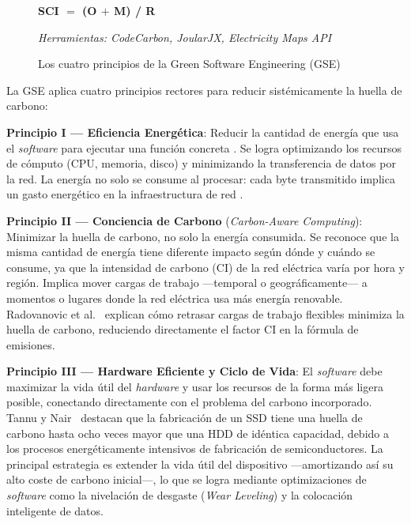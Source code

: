 \begin{figure}[htbp]
\begin{tcbraster}
\begin{tcolorbox}[
  title={Principio IV -- Medici\'on y transparencia},
  colbacktitle=gray!55,
  colframe=gray!50,
  colback=gray!4
]
  \vspace{6pt}\par
  \centering
  \large\textbf{SCI $=$ (O $+$ M) / R}
  \par\vspace{4pt}\raggedright
  \footnotesize\textit{Herramientas: CodeCarbon, JoularJX, Electricity Maps API}
\end{tcolorbox}
\end{tcbraster}
\caption{Los cuatro principios de la Green Software Engineering (GSE)}
\label{fig:gse-principios}
\end{figure}

La GSE aplica cuatro principios rectores para reducir sistémicamente la huella de carbono:



\textbf{Principio I — Eficiencia Energética}: Reducir la cantidad de energía que usa el \textit{software} para ejecutar una función concreta \cite{junger2024potentials}. Se logra optimizando los recursos de cómputo (CPU, memoria, disco) y minimizando la transferencia de datos por la red. La energía no solo se consume al procesar: cada byte transmitido implica un gasto energético en la infraestructura de red \cite{verdecchia2021green}.


\textbf{Principio II — Conciencia de Carbono} (\textit{Carbon-Aware Computing}): Minimizar la huella de carbono, no solo la energía consumida. Se reconoce que la misma cantidad de energía tiene diferente impacto según dónde y cuándo se consume, ya que la intensidad de carbono (CI) de la red eléctrica varía por hora y región. Implica mover cargas de trabajo —temporal o geográficamente— a momentos o lugares donde la red eléctrica usa más energía renovable. Radovanovic et al.~\cite{radovanovic2021carbonaware} explican cómo retrasar cargas de trabajo flexibles minimiza la huella de carbono, reduciendo directamente el factor CI en la fórmula de emisiones.


\textbf{Principio III — Hardware Eficiente y Ciclo de Vida}: El \textit{software} debe maximizar la vida útil del \textit{hardware} y usar los recursos de la forma más ligera posible, conectando directamente con el problema del carbono incorporado. Tannu y Nair~\cite{tannu2023dirty} destacan que la fabricación de un SSD tiene una huella de carbono hasta ocho veces mayor que una HDD de idéntica capacidad, debido a los procesos energéticamente intensivos de fabricación de semiconductores. La principal estrategia es extender la vida útil del dispositivo —amortizando así su alto coste de carbono inicial—, lo que se logra mediante optimizaciones de \textit{software} como la nivelación de desgaste (\textit{Wear Leveling}) y la colocación inteligente de datos.


